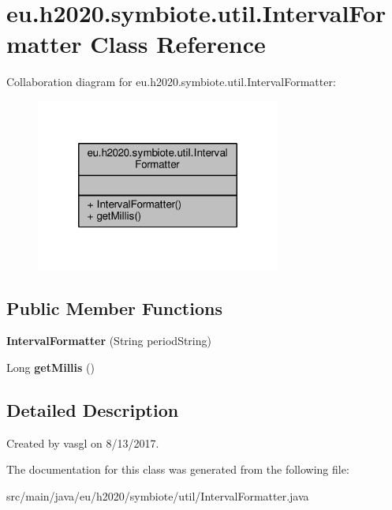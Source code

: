 \hypertarget{classeu_1_1h2020_1_1symbiote_1_1util_1_1IntervalFormatter}{}\section{eu.\+h2020.\+symbiote.\+util.\+Interval\+Formatter Class Reference}
\label{classeu_1_1h2020_1_1symbiote_1_1util_1_1IntervalFormatter}


Collaboration diagram for eu.\+h2020.\+symbiote.\+util.\+Interval\+Formatter\+:
\nopagebreak
\begin{figure}[H]
\begin{center}
\leavevmode
\includegraphics[width=228pt]{classeu_1_1h2020_1_1symbiote_1_1util_1_1IntervalFormatter__coll__graph}
\end{center}
\end{figure}
\subsection*{Public Member Functions}
\begin{DoxyCompactItemize}
\item 
\mbox{\label{classeu_1_1h2020_1_1symbiote_1_1util_1_1IntervalFormatter_a4ca7916c117b4d8dafb7f3b7587535f4}} 
{\bfseries Interval\+Formatter} (String period\+String)
\item 
\mbox{\label{classeu_1_1h2020_1_1symbiote_1_1util_1_1IntervalFormatter_abf76c7f7680fa9eb7aed866ef2e04094}} 
Long {\bfseries get\+Millis} ()
\end{DoxyCompactItemize}


\subsection{Detailed Description}
Created by vasgl on 8/13/2017. 

The documentation for this class was generated from the following file\+:\begin{DoxyCompactItemize}
\item 
src/main/java/eu/h2020/symbiote/util/Interval\+Formatter.\+java\end{DoxyCompactItemize}

